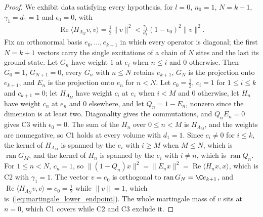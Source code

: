 \begin{proof}\leanok
    We exhibit data satisfying every hypothesis, for $l=0$, $n_0=1$, $N=k+1$,
    $\gamma_1=d_1=1$ and $\epsilon_0=0$, with
    \begin{align}
        \operatorname{Re}\langle H_{\Lambda_N}v,v\rangle=\tfrac12\lVert v\rVert^2
        <\frac{\gamma_1}{d_1}(1-\epsilon_0)^2\lVert v\rVert^2.
        \label{eq:martingale_lower_endpoint}
    \end{align}
    Fix an orthonormal basis $e_0,\dots,e_{k+1}$ in which every operator is diagonal;
    the first $N=k+1$ vectors carry the single excitations of a chain of $N$ sites and
    the last its ground state. Let $G_n$ have weight $1$ at $e_i$ when $n\le i$ and $0$
    otherwise. Then $G_0=1$, $G_{N+1}=0$, every $G_n$ with $n\le N$ retains $e_{k+1}$,
    $G_N$ is the projection onto $e_{k+1}$, and $E_n$ is the projection onto $e_n$ for
    $n<N$. Let $c_0=\tfrac12$, $c_i=1$ for $1\le i\le k$ and $c_{k+1}=0$; let
    $H_{\Lambda_M}$ have weight $c_i$ at $e_i$ when $i<M$ and $0$ otherwise, let $H_n$
    have weight $c_n$ at $e_n$ and $0$ elsewhere, and let $Q_n=1-E_n$, nonzero since the
    dimension is at least two. Diagonality gives the commutations, and $Q_nE_n=0$ gives
    C3 with $\epsilon_0=0$. The sum of the $H_n$ over $0\le n<M$ is $H_{\Lambda_M}$, and
    the weights are nonnegative, so C1 holds at every volume with $d_1=1$. Since
    $c_i\neq0$ for $i\le k$, the kernel of $H_{\Lambda_M}$ is spanned by the $e_i$ with
    $i\ge M$ when $M\le N$, which is $\operatorname{ran}G_M$, and the kernel of $H_n$
    is spanned by the $e_i$ with $i\neq n$, which is $\operatorname{ran}Q_n$. For
    $1\le n<N$, $c_n=1$, so $\lVert(1-Q_n)x\rVert^2=\lVert E_nx\rVert^2=
        \operatorname{Re}\langle H_nx,x\rangle$, which is C2 with $\gamma_1=1$. The vector
    $v=e_0$ is orthogonal to $\operatorname{ran}G_N=\C e_{k+1}$, and
    $\operatorname{Re}\langle H_{\Lambda_N}v,v\rangle=c_0=\tfrac12$ while
    $\lVert v\rVert=1$, which is~(\ref{eq:martingale_lower_endpoint}). The whole
    martingale mass of $v$ sits at $n=0$, which C1 covers while C2 and C3 exclude it.
\end{proof}

